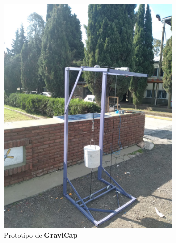             \begin{figure}[H]
                \centering
                \begin{subfigure}[b]{0.3\textwidth}
                    \centering
                    \includegraphics[width=\textwidth]{Imagenes/Estructura/Prototipo.jpg}
                    \caption{Prototipo de \textcolor{dark_violet}{\textbf{GraviCap}}}
                    \label{fig:e1.1}
                \end{subfigure}
                \begin{subfigure}[b]{0.3\textwidth}
                    \centering

\end{subfigure}
\end{figure}

